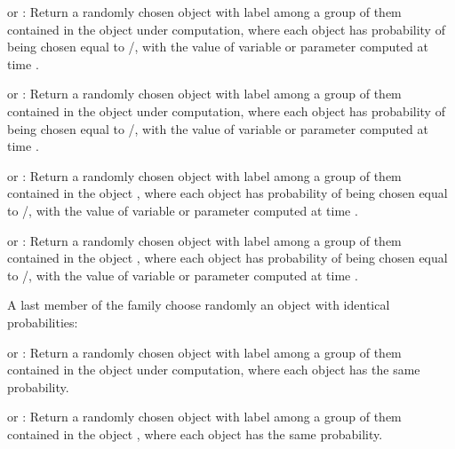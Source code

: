 \documentclass [11pt,a4paper] {book}
\begin{document}
\begin{list}{-}{\itemsep -0.2cm}
\item {} or : Return a randomly chosen object with label  among a group of them contained in the object under computation, where each object has probability of being chosen equal to /, with the value of variable or parameter  computed at time
.

\item {} or : Return a randomly chosen object with label  among a group of them contained in the object under computation, where each object has probability of being chosen equal to /, with the value of variable or parameter  computed at time
.
\item {} or : Return a randomly chosen object with label  among a group of them contained in the object , where each object has probability of being chosen equal to /, with the value of variable or parameter  computed at time
.

\item {} or : Return a randomly chosen object with label  among a group of them contained in the object , where each object has probability of being chosen equal to /, with the value of variable or parameter  computed at time .

\end{list}

A last member of the family choose randomly an object with identical probabilities: 

\begin{list}{-}{\itemsep -0.2cm}
\item {} or : Return a randomly chosen object with label  among a group of them contained in the object under computation, where each object has the same probability.

\item {} or : Return a randomly chosen object with label  among a group of them contained in the object , where each object has the same probability.

\end{list}
\end{document}
